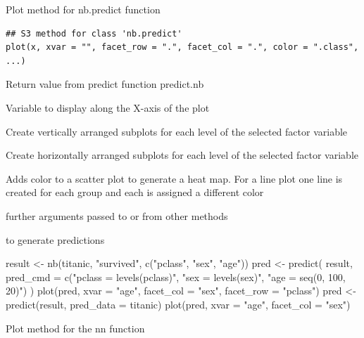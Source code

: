 \documentclass[a4paper]{book}
\begin{document}
%
\begin{Description}
Plot method for nb.predict function
\end{Description}
%
\begin{Usage}
\begin{verbatim}
## S3 method for class 'nb.predict'
plot(x, xvar = "", facet_row = ".", facet_col = ".", color = ".class", ...)
\end{verbatim}
\end{Usage}
%
\begin{Arguments}
\begin{ldescription}
\item[\code{x}] Return value from predict function predict.nb

\item[\code{xvar}] Variable to display along the X-axis of the plot

\item[\code{facet\_row}] Create vertically arranged subplots for each level of the selected factor variable

\item[\code{facet\_col}] Create horizontally arranged subplots for each level of the selected factor variable

\item[\code{color}] Adds color to a scatter plot to generate a heat map. For a line plot one line is created for each group and each is assigned a different color

\item[\code{...}] further arguments passed to or from other methods
\end{ldescription}
\end{Arguments}
%
\begin{SeeAlso}
 to generate predictions
\end{SeeAlso}
%
\begin{Examples}
\begin{ExampleCode}
result <- nb(titanic, "survived", c("pclass", "sex", "age"))
pred <- predict(
  result,
  pred_cmd = c("pclass = levels(pclass)", "sex = levels(sex)", "age = seq(0, 100, 20)")
)
plot(pred, xvar = "age", facet_col = "sex", facet_row = "pclass")
pred <- predict(result, pred_data = titanic)
plot(pred, xvar = "age", facet_col = "sex")

\end{ExampleCode}
\end{Examples}
%
\begin{Description}
Plot method for the nn function
\end{Description}
\end{document}
